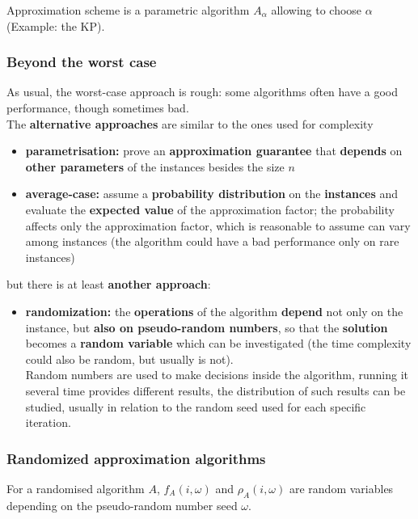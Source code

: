 Approximation scheme is a parametric algorithm $A_\alpha$ allowing to choose $\alpha$ (Example: the KP).\\

\newpage

\subsubsection{Beyond the worst case}
As usual, the worst-case approach is rough: some algorithms often have a good performance, though sometimes bad.\\

The \textbf{alternative approaches} are similar to the ones used for complexity
\begin{itemize}
	\item \textbf{parametrisation:} prove an \textbf{approximation guarantee} that \textbf{depends} on \textbf{other parameters} of the instances besides the size $n$
	\item \textbf{average-case:} assume a \textbf{probability distribution} on the \textbf{instances} and evaluate the \textbf{expected value} of the approximation factor; the probability affects only the approximation factor, which is reasonable to assume can vary among instances (the algorithm could have a bad performance only on rare instances)
\end{itemize}

but there is at least \textbf{another approach}: 
\begin{itemize}
	\item \textbf{randomization:} the \textbf{operations} of the algorithm \textbf{depend} not only on the instance, but \textbf{also on pseudo-random numbers}, so that the \textbf{solution} becomes a \textbf{random variable} which can be investigated (the time complexity could also be random, but usually is not).\\ 
	Random numbers are used to make decisions inside the algorithm, running it several time provides different results, the distribution of such results can be studied, usually in relation to the random seed used for each specific iteration. \\
\end{itemize}

\newpage

\subsubsection{Randomized approximation algorithms}
For a randomised algorithm $A$, $f_A (i , \omega)$ and $\rho_A (i , \omega)$ are random variables depending on the pseudo-random number seed $\omega$.\\

